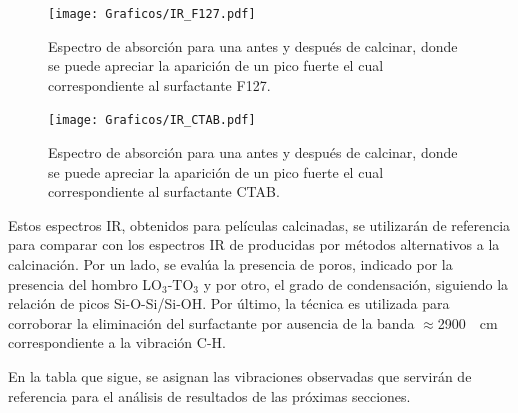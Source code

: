 				\begin{figure}[!h]
						\begin{center}
						\texttt{[image: Graficos/IR\_F127.pdf]}
						\caption[FTIR para una \pdmF.]{Espectro de absorción para una \pdmF\space antes y después de calcinar, donde se puede apreciar la aparición de un pico fuerte el cual correspondiente al surfactante F127.}
						\label{fig:IR_F127_calciando}
						\end{center}
						\end{figure}
				
				\begin{figure}[!hb]
						\begin{center}
						\texttt{[image: Graficos/IR\_CTAB.pdf]}
						\caption[FTIR para una \pdmC.]{Espectro de absorción para una \pdmC\space antes y después de calcinar, donde se puede apreciar la aparición de un pico fuerte el cual correspondiente al surfactante CTAB.}
						\label{fig:IR_CTAB_calcinado}
						\end{center}
						\end{figure}		
		 
		  Estos espectros IR, obtenidos para películas calcinadas, se utilizarán de referencia para comparar con los espectros IR de \pdm\space producidas por métodos alternativos a la calcinación. Por un lado, se evalúa la presencia de poros, indicado por la presencia del hombro LO$_3$-TO$_3$ y  por otro, el grado de condensación, siguiendo la relación de picos Si-O-Si/Si-OH. Por último, la técnica es utilizada para corroborar la eliminación del surfactante por ausencia de la banda $\approx$\SI{2900}{\per\cm} correspondiente a la vibración C-H.

		 En la tabla que sigue, se asignan las vibraciones observadas que servirán de referencia para el análisis de resultados de las próximas secciones.

